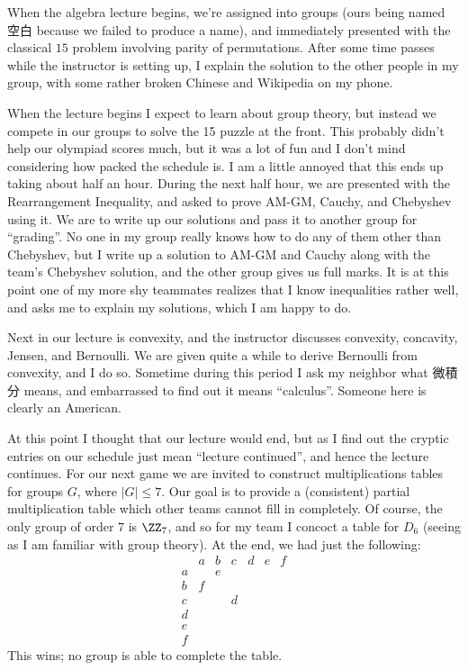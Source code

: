 \documentclass[11pt]{scrreprt}
\begin{document}
When the algebra lecture begins, we're assigned into groups (ours being named 空白 because we failed to produce a name), and immediately presented with the classical $15$ problem involving parity of permutations. After some time passes while the instructor is setting up, I explain the solution to the other people in my group, with some rather broken Chinese and Wikipedia on my phone.

When the lecture begins I expect to learn about group theory, but instead we compete in our groups to solve the 15 puzzle at the front. This probably didn't help our olympiad scores much, but it was a lot of fun and I don't mind considering how packed the schedule is. I am a little annoyed that this ends up taking about half an hour.
During the next half hour, we are presented with the Rearrangement Inequality, and asked to prove AM-GM, Cauchy, and Chebyshev using it. We are to write up our solutions and pass it to another group for ``grading''.
No one in my group really knows how to do any of them other than Chebyshev, but I write up a solution to AM-GM and Cauchy along with the team's Chebyshev solution, and the other group gives us full marks.
It is at this point one of my more shy teammates realizes that I know inequalities rather well, and asks me to explain my solutions, which I am happy to do.

Next in our lecture is convexity, and the instructor discusses convexity, concavity, Jensen, and Bernoulli. We are given quite a while to derive Bernoulli from convexity, and I do so. Sometime during this period I ask my neighbor what 微積分 means, and embarrassed to find out it means ``calculus''. Someone here is clearly an American.

At this point I thought that our lecture would end, but as I find out the cryptic entries on our schedule just mean ``lecture continued'', and hence the lecture continues. For our next game we are invited to construct multiplications tables for groups $G$, where $\left\lvert G \right\rvert \le 7$. Our goal is to provide a (consistent) partial multiplication table which other teams cannot fill in completely.
Of course, the only group of order $7$ is $\ZZ_7$, and so for my team I concoct a table for $D_6$ (seeing as I am familiar with group theory). At the end, we had just the following:
\[
  \begin{array}{r|cccccc}
    & a&b&c&d&e&f \\ \hline
    a& &e&&&& \\
    b& f&&&&& \\
    c& &&d&&& \\
    d& &&&&& \\
    e& &&&&& \\
    f& &&&&&
  \end{array}
\]
This wins; no group is able to complete the table.
\end{document}
